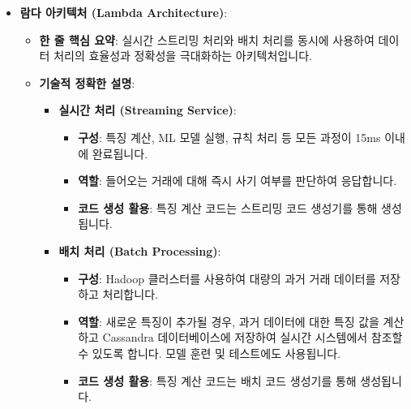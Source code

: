 \documentclass[11pt,a4paper]{article}
\begin{document}
\begin{itemize}
\begin{itemize}
\begin{itemize}
\begin{itemize}
\begin{itemize}
    \item \textbf{람다 아키텍처 (Lambda Architecture)}:
    \begin{itemize}
        \item \textbf{한 줄 핵심 요약}: 실시간 스트리밍 처리와 배치 처리를 동시에 사용하여 데이터 처리의 효율성과 정확성을 극대화하는 아키텍처입니다.
        \item \textbf{기술적 정확한 설명}:
        \begin{itemize}
            \item \textbf{실시간 처리 (Streaming Service)}:
            \begin{itemize}
                \item \textbf{구성}: 특징 계산, ML 모델 실행, 규칙 처리 등 모든 과정이 15ms 이내에 완료됩니다.
                \item \textbf{역할}: 들어오는 거래에 대해 즉시 사기 여부를 판단하여 응답합니다.
                \item \textbf{코드 생성 활용}: 특징 계산 코드는 스트리밍 코드 생성기를 통해 생성됩니다.
            \end{itemize}
            \item \textbf{배치 처리 (Batch Processing)}:
            \begin{itemize}
                \item \textbf{구성}: Hadoop 클러스터를 사용하여 대량의 과거 거래 데이터를 저장하고 처리합니다.
                \item \textbf{역할}: 새로운 특징이 추가될 경우, 과거 데이터에 대한 특징 값을 계산하고 Cassandra 데이터베이스에 저장하여 실시간 시스템에서 참조할 수 있도록 합니다. 모델 훈련 및 테스트에도 사용됩니다.
                \item \textbf{코드 생성 활용}: 특징 계산 코드는 배치 코드 생성기를 통해 생성됩니다.
            \end{itemize}
        \end{itemize}
    \end{itemize}


\end{itemize}
\end{itemize}
\end{itemize}
\end{itemize}
\end{itemize}
\end{document}
